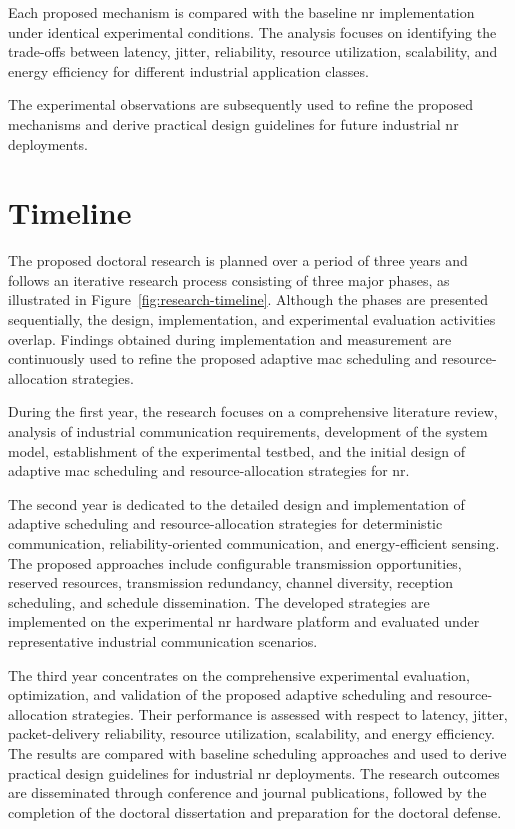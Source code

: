 \documentclass[12pt,a4paper]{article}
\begin{document}
Each proposed mechanism is compared with the baseline \gls{nr} implementation under identical experimental conditions. The analysis focuses on identifying the trade-offs between latency, jitter, reliability, resource utilization, scalability, and energy efficiency for different industrial application classes.

The experimental observations are subsequently used to refine the proposed mechanisms and derive practical design guidelines for future industrial \gls{nr} deployments.


\section{Timeline}

The proposed doctoral research is planned over a period of three years and follows an iterative research process consisting of three major phases, as illustrated in Figure~\ref{fig:research-timeline}. Although the phases are presented sequentially, the design, implementation, and experimental evaluation activities overlap. Findings obtained during implementation and measurement are continuously used to refine the proposed adaptive \gls{mac} scheduling and resource-allocation strategies.

During the first year, the research focuses on a comprehensive literature review, analysis of industrial communication requirements, development of the system model, establishment of the experimental testbed, and the initial design of adaptive \gls{mac} scheduling and resource-allocation strategies for \gls{nr}. 

The second year is dedicated to the detailed design and implementation of adaptive scheduling and resource-allocation strategies for deterministic communication, reliability-oriented communication, and energy-efficient sensing. The proposed approaches include configurable transmission opportunities, reserved resources, transmission redundancy, channel diversity, reception scheduling, and schedule dissemination. The developed strategies are implemented on the experimental \gls{nr} hardware platform and evaluated under representative industrial communication scenarios.

The third year concentrates on the comprehensive experimental evaluation, optimization, and validation of the proposed adaptive scheduling and resource-allocation strategies. Their performance is assessed with respect to latency, jitter, packet-delivery reliability, resource utilization, scalability, and energy efficiency. The results are compared with baseline scheduling approaches and used to derive practical design guidelines for industrial \gls{nr} deployments. The research outcomes are disseminated through conference and journal publications, followed by the completion of the doctoral dissertation and preparation for the doctoral defense.
\end{document}
